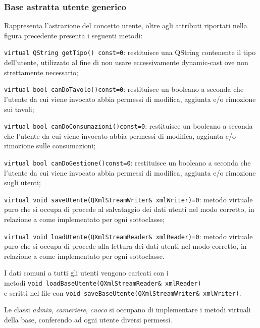 \subsubsection{Base astratta utente generico}
Rappresenta l'astrazione del concetto utente, oltre agli attributi riportati nella figura precedente presenta i seguenti metodi:

\textbullet \verb|virtual QString getTipo() const=0|:
restituisce una QString contenente il tipo dell'utente, utilizzato al fine di non usare eccessivamente dynamic-cast ove non strettamente necessario;

\textbullet \verb|virtual bool canDoTavolo()const=0|: 
restituisce un booleano a seconda che l'utente da cui viene invocato abbia permessi di modifica, aggiunta e/o rimozione sui tavoli; 

\textbullet \verb|virtual bool canDoConsumazioni()const=0|:
restituisce un booleano a seconda che l'utente da cui viene invocato abbia permessi di modifica, aggiunta e/o rimozione sulle consumazioni;

\textbullet \verb|virtual bool canDoGestione()const=0|:
restituisce un booleano a seconda che l'utente da cui viene invocato abbia permessi di modifica, aggiunta e/o rimozione sugli utenti;

\textbullet \verb|virtual void saveUtente(QXmlStreamWriter& xmlWriter)=0|:
metodo virtuale puro che si occupa di procede al salvataggio dei dati utenti nel modo corretto, in relazione a come implementato per ogni sottoclasse;

\textbullet \verb|virtual void loadUtente(QXmlStreamReader& xmlReader)=0|:
metodo virtuale puro che si occupa di procede alla lettura dei dati utenti nel modo corretto, in relazione a come implementato per ogni sottoclasse.

I dati comuni a tutti gli utenti vengono caricati con i \\
metodi \verb|void loadBaseUtente(QXmlStreamReader& xmlReader)| \\
e scritti nel file con  \verb|void saveBaseUtente(QXmlStreamWriter& xmlWriter)|.

Le classi \textit{admin}, \textit{cameriere}, \textit{cuoco} si occupano di implementare i metodi virtuali della base, conferendo ad ogni utente diversi permessi.

